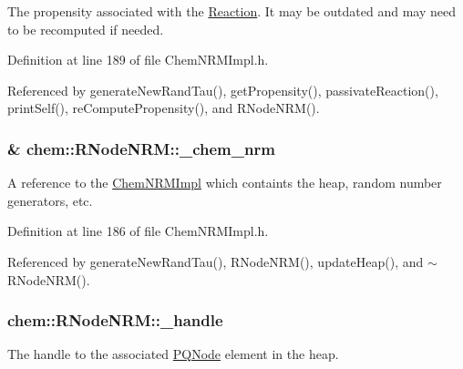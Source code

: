 The propensity associated with the \hyperlink{classchem_1_1Reaction}{Reaction}. It may be outdated and may need to be recomputed if needed. 



Definition at line 189 of file Chem\-N\-R\-M\-Impl.\-h.



Referenced by generate\-New\-Rand\-Tau(), get\-Propensity(), passivate\-Reaction(), print\-Self(), re\-Compute\-Propensity(), and R\-Node\-N\-R\-M().

\hypertarget{classchem_1_1RNodeNRM_acff43a1b27a778b6534bd8010904f821}{
\subsubsection[{\-\_\-chem\-\_\-nrm}]{\& {\bf chem\-::\-R\-Node\-N\-R\-M\-::\-\_\-chem\-\_\-nrm}}}\label{classchem_1_1RNodeNRM_acff43a1b27a778b6534bd8010904f821}


A reference to the \hyperlink{classchem_1_1ChemNRMImpl}{Chem\-N\-R\-M\-Impl} which containts the heap, random number generators, etc. 



Definition at line 186 of file Chem\-N\-R\-M\-Impl.\-h.



Referenced by generate\-New\-Rand\-Tau(), R\-Node\-N\-R\-M(), update\-Heap(), and $\sim$\-R\-Node\-N\-R\-M().

\hypertarget{classchem_1_1RNodeNRM_ad124c85b0f1b479cf0c1f4bf75230c19}{
\subsubsection[{\-\_\-handle}]{ {\bf chem\-::\-R\-Node\-N\-R\-M\-::\-\_\-handle}}}\label{classchem_1_1RNodeNRM_ad124c85b0f1b479cf0c1f4bf75230c19}


The handle to the associated \hyperlink{classchem_1_1PQNode}{P\-Q\-Node} element in the heap. 



